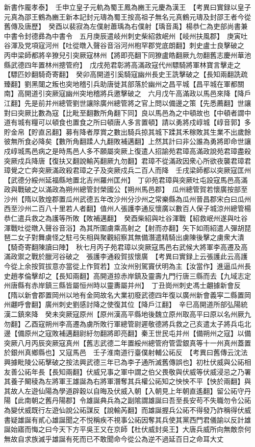 新書作龎孝泰】　壬申立皇子元軌為蜀王鳳為豳王元慶為漢王　【考異曰實録以皇子元真為邵王鶴為豳王新本記封元璹為蜀王按高祖子無名元真鶴元璹及封邵王者今從舊傳及唐歷】　癸酉以裴寂為左僕射蕭瑀為右僕射【瑀音禹】楊恭仁為吏部尚書兼中書令封德彞為中書令　五月庚辰遣岐州刺史柴紹救岷州【岐州扶風郡】　庚寅吐谷渾及党項寇河州【吐從暾入聲谷音浴河州枹罕郡党底朗翻】刺史盧士良擊破之　丙申梁師都將辛獠兒引突厥寇林州【將即亮翻下同獠盧皓翻厥九勿翻舊志慶州華池縣武德四年置林州摠管府】　戊戌苑君彰將高滿政寇代州驃騎將軍林寶言擊走之【驃匹妙翻騎奇寄翻】　癸卯高開道引奚騎寇幽州長史王詵擊破之【長知兩翻詵疏臻翻】劉黑闥之叛也突地稽引兵助唐徙其部落於幽州之昌平城【昌平城在軍都關南】高開道引突厥寇幽州突地稽將兵邀擊破之　六月戊午高滿政以馬邑來降【降戶江翻】先是前并州總管劉世讓除廣州總管將之官上問以備邊之策【先悉薦翻】世讓對曰突厥比數為寇【比毗至翻數所角翻下同】良以馬邑為之中頓故也【中頓者謂中道有城有糧可以頓食也置食之所曰頓唐人多言置頓】請以勇將戍崞城【崞音郭】多貯金帛【貯直呂翻】募有降者厚賞之數出騎兵掠其城下蹂其禾稼敗其生業不出歲餘彼無所食必降矣【數所角翻蹂人九翻敗補邁翻】上然其計曰非公誰為勇將即命世讓戍崞城馬邑病之是時馬邑人多不願屬突厥上復遣人招諭苑君璋高滿政說苑君璋盡殺突厥戍兵降唐【復扶又翻說輸芮翻厥九勿翻】君璋不從滿政因衆心所欲夜襲君璋君璋覺之亡奔突厥滿政殺君璋之子及突厥戍兵二百人而降　壬戌梁師都以突厥寇匡州【武德分綏州延福縣地置北吉州羅州匡州】　丁卯苑君璋與突厥吐屯設寇馬邑高滿政與戰破之以滿政為朔州總管封榮國公【朔州馬邑郡】　瓜州總管賀若懷廣按部至沙州【隋以敦煌郡置瓜州武德五年改沙州分沙州之常樂縣為瓜州晉昌郡宋白曰瓜州西至沙州二百八十里若人者翻】值州人張護李通反懷廣以數百人保子城涼州總管楊恭仁遣兵救之為護等所敗【敗補邁翻】　癸酉柴紹與吐谷渾戰【紹救岷州遂與吐谷渾戰吐從暾入聲谷音浴】為其所圍虜乘高射之【射而亦翻】矢下如雨紹遣人彈胡琵琶二女子對舞虜怪之駐弓矢相與聚觀紹察其無備潛遣精騎出虜陳後擊之虜衆大潰【騎奇寄翻陳讀曰陣】　秋七月丙子苑君璋以突厥寇馬邑右武候大將軍李高遷及高滿政禦之戰於臘河谷破之　張護李通殺賀拔懷廣　【考異曰實録上云張護此云高護今從上余按賀拔意亦當從上作賀若】立汝州别駕竇伏明為主【汝當作】進逼瓜州長史趙孝倫擊却之【長知兩翻】高開道掠赤岸鎮及靈壽九門行唐三縣而去【九域志定州唐縣有赤岸鎮三縣皆屬恒州時以靈夀屬并州】　丁丑崗州刺史馮士翽據新會反【隋以新會郡置岡州以地有金岡故名大業初廢武德四年復以廣州新會義寜二縣置岡州翽呼會翻】廣州刺史劉感討降之使復其位【降戶江翻】　辛巳高開道所部弘陽統漢二鎮來降　癸未突厥寇原州【原州漢高平縣地後魏立原州取高平曰原以名州厥九勿翻】乙酉寇朔州李高遷為虜所敗行軍總管尉遲敬德將兵救之己亥遣太子將兵屯北邊【備原州之寇敗補邁翻尉紆勿翻將即亮翻】秦王世民屯并州【備朔州之寇】以備突厥八月丙辰突厥寇真州【舊志武德二年置綏州總管府管雲銀真等十一州真州蓋置於銀州真鄉縣也】又寇馬邑　壬子淮南道行臺僕射輔公祏反　【考異曰舊傳云沈法興據毗陵公祏擊破之按法興武德三年已為李子通所滅舊傳誤也】初杜伏威與公祏相友善公祏年長【長知兩翻】伏威兄事之軍中謂之伯父畏敬與伏威等伏威浸忌之乃署其養子闞稜為左將軍王雄誕為右將軍潛奪其兵權公祏知之怏怏不平【怏於兩翻】與其故人左遊仙陽為學道辟穀以自晦及伏威入朝【入朝見上年朝直遙翻】留公祏守丹陽【此南朝之舊丹陽郡】令雄誕典兵為之副隂謂雄誕曰吾至長安苟不失職勿令公祏為變伏威既行左遊仙說公祏謀反【說輸芮翻】而雄誕握兵公祏不得發乃詐稱得伏威書疑雄誕有貳心雄誕聞之不悦稱疾不視事公祏因奪其兵使其黨西門君儀諭以反計雄誕始寤而悔之曰今天下方平吳王又在京師【杜伏威封吳王】大唐兵威所向無敵奈何無故自求族滅乎雄誕有死而已不敢聞命今從公為逆不過延百日之命耳大丈